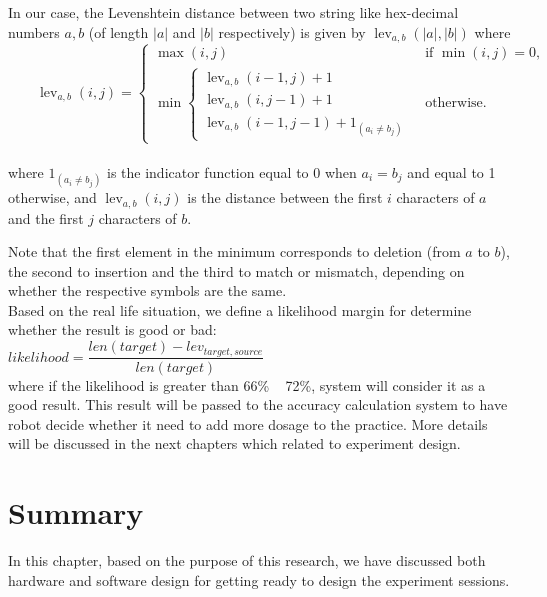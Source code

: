 In our case, the Levenshtein distance between two string like hex-decimal numbers 
${\displaystyle a,b}$ (of length ${\displaystyle |a|}$ and ${\displaystyle |b|}$ respectively) 
is given by ${\displaystyle \operatorname {lev} _{a,b}(|a|,|b|)}$ where
\\

${\displaystyle \qquad \operatorname {lev} _{a,b}(i,j)={\begin{cases}\max(i,j)&{\text{ if }}\min(i,j)=0,\\\min {\begin{cases}\operatorname {lev} _{a,b}(i-1,j)+1\\\operatorname {lev} _{a,b}(i,j-1)+1\\\operatorname {lev} _{a,b}(i-1,j-1)+1_{(a_{i}\neq b_{j})}\end{cases}}&{\text{ otherwise.}}\end{cases}}}$\\
\\

where ${\displaystyle 1_{(a_{i}\neq b_{j})}}$ is the indicator function equal to 0 when 
${\displaystyle a_{i}=b_{j}}$ and equal to 1 otherwise, and ${\displaystyle \operatorname {lev} _{a,b}(i,j)}$ 
is the distance between the first ${\displaystyle i}$ characters of ${\displaystyle a}$ and the
first ${\displaystyle j}$ characters of ${\displaystyle b}$.

Note that the first element in the minimum corresponds to deletion (from ${\displaystyle a}$ to 
${\displaystyle b}$), the second to insertion and the third to match or mismatch, depending on 
whether the respective symbols are the same.\\

Based on the real life situation, we define a likelihood margin for determine whether the result
is good or bad: \\
  
${likelihood = \dfrac{len(target) - lev_{target,source}}{len(target)}}$\\

where if the likelihood is greater than 66\% ~ 72\%, system will consider it as a good result.
This result will be passed to the accuracy calculation system to have robot decide whether it
need to add more dosage to the practice. More details will be discussed in the next chapters
which related to experiment design.\\

\section{Summary}
In this chapter, based on the purpose of this research, we have discussed both hardware
and software design for getting ready to design the experiment sessions.\\

